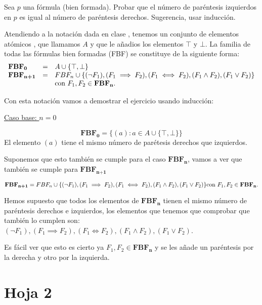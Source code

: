 	\begin{problem}
	 Sea $p$ una f\'ormula (bien formada). Probar que el n\'umero de par\'entesis izquierdos en
	$p$ es igual al  n\'umero de par\'entesis derechos. Sugerencia, usar inducci\'on. 
	\solution
	
	Atendiendo a la notación dada en clase , tenemos un conjunto de elementos atómicos , que llamamos $A$ y que le añadios los elementos $\top$ y $\bot$. La familia de todas las fórmulas bien formadas (FBF) se constituye de la siguiente forma:
\begin{equation*}
	\begin{array}{l l l}
		\textbf{FBF}_\textbf{0} &=& A\cup\{\top, \perp \}\\
		\textbf{FBF}_\textbf{n+1} &=& FBF_n \cup \{(\neg F_1), (F_1\implies F_2),(F_1\iff F_2),(F_1\wedge F_2),(F_1\vee F_2)\}\\ &&\text{con } F_1,F_2\in \textbf{FBF}_\textbf{n}.
	\end{array}
\end{equation*}

Con esta notación vamos a demostrar el ejercicio usando inducción:

\underline{Caso base: $n=0$}

$$\textbf{FBF}_\textbf{0} = \{(a) : a\in A \cup \{\top , \bot\}\}$$
El elemento $(a)$ tiene el mismo número de parétesis derechos que izquierdos.

Suponemos que esto también se cumple para el caso $\textbf{FBF}_\textbf{n}$, vamos a ver que también se cumple para $\textbf{FBF}_\textbf{n+1}$

$$\textbf{FBF}_\textbf{n+1} = FBF_n \cup \{(\neg F_1), (F_1\implies F_2),(F_1\iff F_2),(F_1\wedge F_2),(F_1\vee F_2)\}\\ \text{con } F_1,F_2\in \textbf{FBF}_\textbf{n}.$$

Hemos supuesto que todos los elementos de $\textbf{FBF}_\textbf{n}$ tienen el mismo número de paréntesis derechos e izquierdos, los elementos que tenemos que comprobar que también lo cumplen son:$(\neg F_1), (F_1\implies F_2),(F_1\iff F_2),(F_1\wedge F_2),(F_1\vee F_2)$.

Es fácil ver que esto es cierto ya $ F_1,F_2\in \textbf{FBF}_\textbf{n}$ y se les añade un paréntesis por la derecha y otro por la izquierda.
\end{problem}

\section{Hoja 2}

